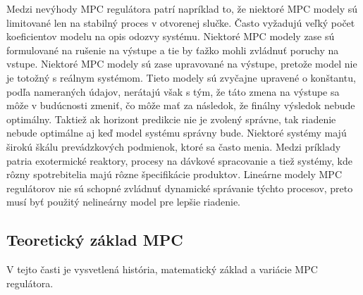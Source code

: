 \indent Medzi nevýhody MPC regulátora patrí napríklad to, že niektoré MPC modely sú limitované len na stabilný proces v otvorenej slučke. Často vyžadujú veľký počet koeficientov modelu na opis odozvy systému. Niektoré MPC modely zase sú formulované na  rušenie na výstupe a tie by ťažko mohli zvládnuť poruchy na vstupe. Niektoré MPC modely sú zase upravované na výstupe, pretože model nie je totožný s reálnym systémom. Tieto modely sú zvyčajne upravené o konštantu, podľa nameraných údajov, nerátajú však s tým, že táto zmena na výstupe sa môže v budúcnosti zmeniť, čo môže mať za následok, že finálny výsledok nebude optimálny. Taktiež ak horizont predikcie nie je zvolený správne, tak riadenie nebude optimálne aj keď model systému správny bude. Niektoré systémy majú širokú škálu prevádzkových podmienok, ktoré sa často menia. Medzi príklady patria exotermické reaktory, procesy na dávkové spracovanie a tiež systémy, kde rôzny spotrebitelia majú rôzne špecifikácie produktov. Lineárne modely MPC regulátorov nie sú schopné zvládnuť dynamické správanie týchto procesov, preto musí byť použitý nelineárny model pre lepšie riadenie.\cite{MPC02} 
\subsection{Teoretický základ MPC}
V tejto časti je vysvetlená história, matematický základ a variácie MPC regulátora.
